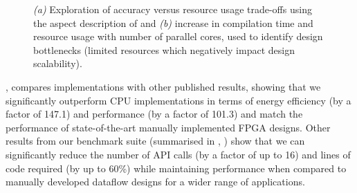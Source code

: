 \begin{figure}[!ht]
{{}
}
\caption[]{\emph{(a)} Exploration of accuracy versus resource usage
  trade-offs using the aspect description of
   and \emph{(b)} increase in compilation
  time and resource usage with number of parallel cores, used to
  identify design bottlenecks (limited resources which negatively
  impact design scalability).}
\label{g:nognot}
\end{figure}


,  compares \FAST{}
implementations with other published results, showing that we
significantly outperform CPU implementations in terms of energy
efficiency (by a factor of 147.1) and performance (by a factor of
101.3) and match the performance of state-of-the-art manually
implemented FPGA designs. Other results from our benchmark suite
(summarised in , ) show that
we can significantly reduce the number of API calls (by a factor of up
to 16) and lines of code required (by up to 60\%) while maintaining
performance when compared to manually developed dataflow designs for a
wider range of applications.
